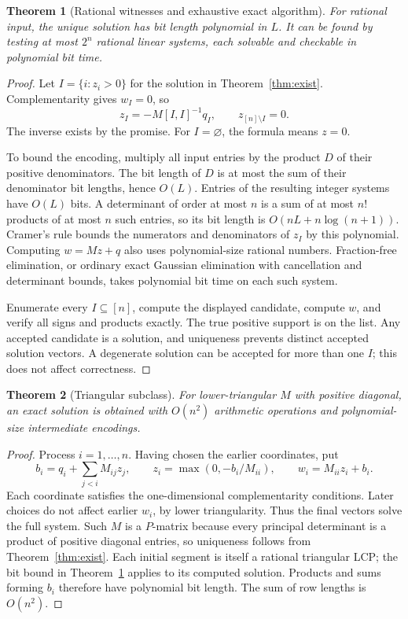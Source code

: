 \documentclass[11pt,a4paper]{article}
\newtheorem{theorem}{Theorem}[section]
\theoremstyle{definition}\newtheorem{definition}[theorem]{Definition}
\theoremstyle{remark}\newtheorem{remark}[theorem]{Remark}
\newcommand{\1}{\mathbf 1}
\begin{document}
\begin{theorem}[Rational witnesses and exhaustive exact algorithm]\label{thm:bits}
For rational input, the unique solution has bit length polynomial in $L$. It can be found by testing at most $2^n$ rational linear systems, each solvable and checkable in polynomial bit time.
\end{theorem}
\begin{proof}
Let $I=\{i:z_i>0\}$ for the solution in Theorem~\ref{thm:exist}. Complementarity gives $w_I=0$, so
\[
 z_I=-M[I,I]^{-1}q_I,\qquad z_{[n]\setminus I}=0.
\]
The inverse exists by the promise. For $I=\varnothing$, the formula means $z=0$.

To bound the encoding, multiply all input entries by the product $D$ of their positive denominators. The bit length of $D$ is at most the sum of their denominator bit lengths, hence $O(L)$. Entries of the resulting integer systems have $O(L)$ bits. A determinant of order at most $n$ is a sum of at most $n!$ products of at most $n$ such entries, so its bit length is $O(nL+n\log(n+1))$. Cramer's rule bounds the numerators and denominators of $z_I$ by this polynomial. Computing $w=Mz+q$ also uses polynomial-size rational numbers. Fraction-free elimination, or ordinary exact Gaussian elimination with cancellation and determinant bounds, takes polynomial bit time on each such system.

Enumerate every $I\subseteq[n]$, compute the displayed candidate, compute $w$, and verify all signs and products exactly. The true positive support is on the list. Any accepted candidate is a solution, and uniqueness prevents distinct accepted solution vectors. A degenerate solution can be accepted for more than one $I$; this does not affect correctness.
\end{proof}

\begin{theorem}[Triangular subclass]\label{thm:tri}
For lower-triangular $M$ with positive diagonal, an exact solution is obtained with $O(n^2)$ arithmetic operations and polynomial-size intermediate encodings.
\end{theorem}
\begin{proof}
Process $i=1,\ldots,n$. Having chosen the earlier coordinates, put
\[
 b_i=q_i+\sum_{j<i}M_{ij}z_j,\qquad
 z_i=\max(0,-b_i/M_{ii}),\qquad w_i=M_{ii}z_i+b_i.
\]
Each coordinate satisfies the one-dimensional complementarity conditions. Later choices do not affect earlier $w_i$, by lower triangularity. Thus the final vectors solve the full system. Such $M$ is a $P$-matrix because every principal determinant is a product of positive diagonal entries, so uniqueness follows from Theorem~\ref{thm:exist}. Each initial segment is itself a rational triangular LCP; the bit bound in Theorem~\ref{thm:bits} applies to its computed solution. Products and sums forming $b_i$ therefore have polynomial bit length. The sum of row lengths is $O(n^2)$.
\end{proof}
\end{document}
